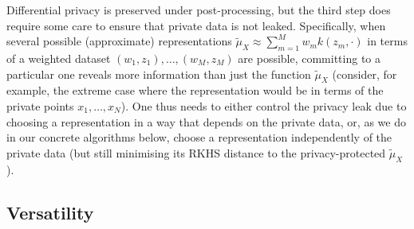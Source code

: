 \documentclass{article}
\theoremstyle{plain}
\theoremstyle{remark}
\theoremstyle{definition}
\begin{document}
Differential privacy is preserved under post-processing, but the third step does require some care to ensure that private data is not leaked. Specifically, when several possible (approximate) representations $\tilde{\mu}_X \approx \sum_{m = 1}^M w_m k(z_m, \cdot)$ in terms of a weighted dataset $(w_1, z_1), \ldots, (w_M, z_M)$ are possible, committing to a particular one reveals more information than just the function $\tilde{\mu}_X$ (consider, for example, the extreme case where the representation would be in terms of the private points $x_1, \ldots, x_N$). One thus needs to either control the privacy leak due to choosing a representation in a way that depends on the private data, or, as we do in our concrete algorithms below, choose a representation independently of the private data (but still minimising its RKHS distance to the privacy-protected $\tilde{\mu}_X$).


\subsection{Versatility}
\end{document}
